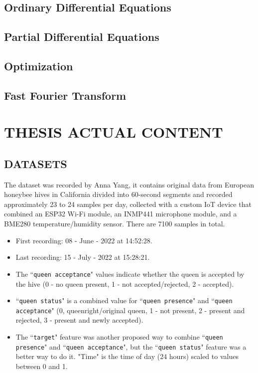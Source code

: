 \documentclass[12pt]{report}
\begin{document}
\section{Ordinary Differential Equations}

\section{Partial Differential Equations}

\section{Optimization}

\section{Fast Fourier Transform}

\newpage
\chapter{THESIS ACTUAL CONTENT}

\section{DATASETS}

\par The dataset\cite{AnnaYang-Dataset} was recorded by Anna Yang, it contains original data from European honeybee hives in California divided into 60-second segments and recorded approximately 23 to 24 samples per day, collected with a custom IoT device that combined an ESP32 Wi-Fi module, an INMP441 microphone module, and a BME280 temperature/humidity sensor. There are 7100 samples in total.

\begin{itemize}
\item First recording: 08 - June - 2022 at 14:52:28.
\item Last recording: 15 - July - 2022 at 15:28:21.
\item The ``{\tt queen acceptance}" values indicate whether the queen is accepted by the hive (0 - no queen present, 1 - not accepted/rejected, 2 - accepted).
\item ``{\tt queen status}" is a combined value for ``{\tt queen presence}" and ``{\tt queen acceptance}" (0, queenright/original queen, 1 - not present, 2 - present and rejected, 3 - present and newly accepted).
\item  The ``{\tt target}" feature was another proposed way to combine ``{\tt queen presence}" and ``{\tt queen acceptance}", but the ``{\tt queen status}" feature was a better way to do it. "Time" is the time of day (24 hours) scaled to values between 0 and 1.
\end{itemize}
\end{document}
